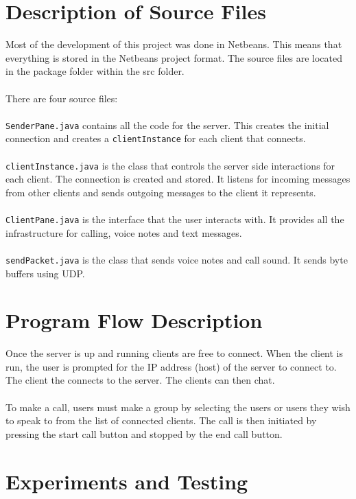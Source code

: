 \documentclass[13pt]{article}
\begin{document}
\section{Description of Source Files}

Most of the development of this project was done in Netbeans. This means that everything is stored in the Netbeans project format. The source files are located in the package folder within the src folder.
\\\\
There are four source files:
\\\\
\texttt{SenderPane.java} contains all the code for the server. This creates the initial connection and creates a \texttt{clientInstance} for each client that connects.
\\\\
\texttt{clientInstance.java} is the class that controls the server side interactions for each client. The connection is created and stored. It listens for incoming messages from other clients and sends outgoing messages to the client it represents.
\\\\
\texttt{ClientPane.java} is the interface that the user interacts with. It provides all the infrastructure for calling, voice notes and text messages.
\\\\
\texttt{sendPacket.java} is the class that sends voice notes and call sound. It sends byte buffers using UDP.

\section{Program Flow Description}

Once the server is up and running clients are free to connect. When the client is run, the user is prompted for the IP address (host) of the server to connect to. The client the connects to the server. The clients can then chat.
\\\\
To make a call, users must make a group by selecting the users or users they wish to speak to from the list of connected clients. The call is then initiated by pressing the start call button and stopped by the end call button.

\section{Experiments and Testing}
\end{document}
